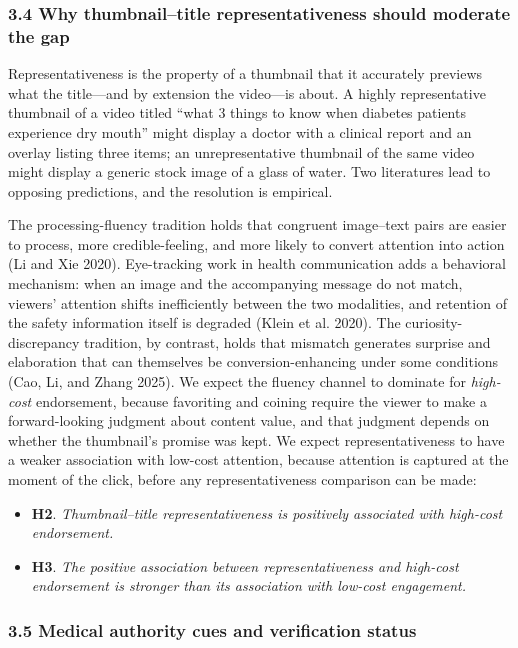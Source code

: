 \documentclass[
  12pt,
]{article}
\providecommand{\tightlist}{%
  \setlength{\itemsep}{0pt}\setlength{\parskip}{0pt}}
\begin{document}
\subsubsection{3.4 Why thumbnail--title representativeness should
moderate the
gap}\label{why-thumbnailtitle-representativeness-should-moderate-the-gap}

Representativeness is the property of a thumbnail that it accurately
previews what the title---and by extension the video---is about. A
highly representative thumbnail of a video titled ``what 3 things to
know when diabetes patients experience dry mouth'' might display a
doctor with a clinical report and an overlay listing three items; an
unrepresentative thumbnail of the same video might display a generic
stock image of a glass of water. Two literatures lead to opposing
predictions, and the resolution is empirical.

The processing-fluency tradition holds that congruent image--text pairs
are easier to process, more credible-feeling, and more likely to convert
attention into action (Li and Xie 2020). Eye-tracking work in health
communication adds a behavioral mechanism: when an image and the
accompanying message do not match, viewers' attention shifts
inefficiently between the two modalities, and retention of the safety
information itself is degraded (Klein et al. 2020). The
curiosity-discrepancy tradition, by contrast, holds that mismatch
generates surprise and elaboration that can themselves be
conversion-enhancing under some conditions (Cao, Li, and Zhang 2025). We
expect the fluency channel to dominate for \emph{high-cost} endorsement,
because favoriting and coining require the viewer to make a
forward-looking judgment about content value, and that judgment depends
on whether the thumbnail's promise was kept. We expect
representativeness to have a weaker association with low-cost attention,
because attention is captured at the moment of the click, before any
representativeness comparison can be made:

\begin{itemize}
\tightlist
\item
  \textbf{H2}. \emph{Thumbnail--title representativeness is positively
  associated with high-cost endorsement.}
\item
  \textbf{H3}. \emph{The positive association between representativeness
  and high-cost endorsement is stronger than its association with
  low-cost engagement.}
\end{itemize}

\subsubsection{3.5 Medical authority cues and verification
status}\label{medical-authority-cues-and-verification-status}
\end{document}
